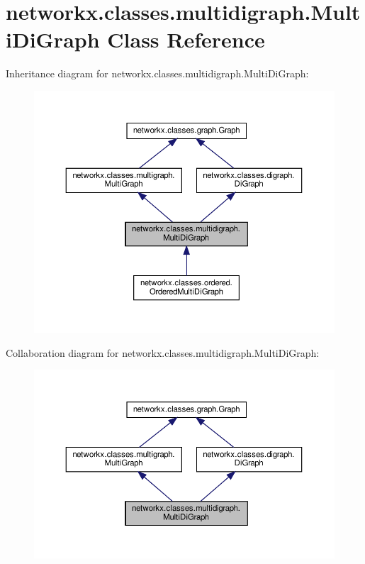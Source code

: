 \hypertarget{classnetworkx_1_1classes_1_1multidigraph_1_1MultiDiGraph}{}\section{networkx.\+classes.\+multidigraph.\+Multi\+Di\+Graph Class Reference}
\label{classnetworkx_1_1classes_1_1multidigraph_1_1MultiDiGraph}


Inheritance diagram for networkx.\+classes.\+multidigraph.\+Multi\+Di\+Graph\+:
\nopagebreak
\begin{figure}[H]
\begin{center}
\leavevmode
\includegraphics[width=350pt]{classnetworkx_1_1classes_1_1multidigraph_1_1MultiDiGraph__inherit__graph}
\end{center}
\end{figure}


Collaboration diagram for networkx.\+classes.\+multidigraph.\+Multi\+Di\+Graph\+:
\nopagebreak
\begin{figure}[H]
\begin{center}
\leavevmode
\includegraphics[width=350pt]{classnetworkx_1_1classes_1_1multidigraph_1_1MultiDiGraph__coll__graph}
\end{center}
\end{figure}
